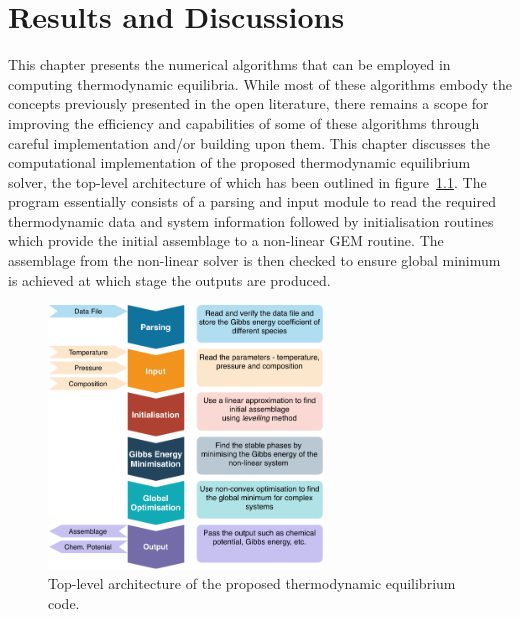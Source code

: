 \chapter{Results and Discussions} \label{chap:results}


	This chapter presents the numerical algorithms that can be employed in computing thermodynamic equilibria. While most of these algorithms embody the concepts previously presented in the open literature, there remains a scope for improving the efficiency and capabilities of some of these algorithms through careful implementation and/or building upon them. This chapter discusses the computational implementation of the proposed thermodynamic equilibrium solver, the top-level architecture of which has been outlined in figure~\ref{fig:structure}. The program essentially consists of a parsing and input module to read the required thermodynamic data and system information followed by initialisation routines which provide the initial assemblage to a non-linear GEM routine. The assemblage from the non-linear solver is then checked to ensure global minimum is achieved at which stage the outputs are produced.
	\begin{figure}[htbp]
	 	\centering
	   	\includegraphics[width=0.65\textwidth]{figures/YJ_structure.pdf}
	   	\caption{Top-level architecture of the proposed thermodynamic equilibrium code.}
	   	\label{fig:structure}
	\end{figure}

